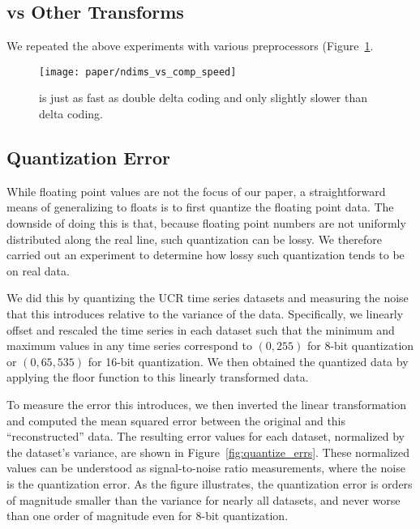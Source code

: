 

\subsection{\mine vs Other Transforms}

We repeated the above experiments with various preprocessors (Figure~\ref{fig:ndims_vs_preproc_speed}.

\begin{figure}[h]
\begin{center}
    \texttt{[image: paper/ndims\_vs\_comp\_speed]}
    \caption{\fire is just as fast as double delta coding and only slightly slower than delta coding.}
    \label{fig:ndims_vs_preproc_speed}
\end{center}
\end{figure}

\subsection{Quantization Error}


While floating point values are not the focus of our paper, a straightforward means of generalizing \minesp to floats is to first quantize the floating point data. The downside of doing this is that, because floating point numbers are not uniformly distributed along the real line, such quantization can be lossy. We therefore carried out an experiment to determine how lossy such quantization tends to be on real data.

We did this by quantizing the UCR time series datasets and measuring the noise that this introduces relative to the variance of the data. Specifically, we linearly offset and rescaled the time series in each dataset such that the minimum and maximum values in any time series correspond to $(0, 255)$ for 8-bit quantization or $(0, 65,535)$ for 16-bit quantization. We then obtained the quantized data by applying the floor function to this linearly transformed data.

To measure the error this introduces, we then inverted the linear transformation and computed the mean squared error between the original and this ``reconstructed'' data. The resulting error values for each dataset, normalized by the dataset's variance, are shown in Figure~\ref{fig:quantize_errs}. These normalized values can be understood as signal-to-noise ratio measurements, where the noise is the quantization error. As the figure illustrates, the quantization error is orders of magnitude smaller than the variance for nearly all datasets, and never worse than one order of magnitude even for 8-bit quantization.

